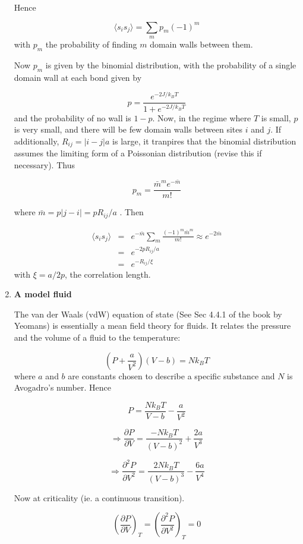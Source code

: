 \documentclass[a4paper,12pt,twoside]{article}
\begin{document}
\begin{enumerate}
Hence

\[
\langle s_i s_j\rangle =\sum_m p_m(-1)^m
\]
with $p_m$ the probability of finding $m$ domain walls between them.

Now $p_m$ is given by the binomial distribution, with the probability of
a single domain wall at each bond given by 

\[
p=\frac{e^{-2J/k_BT}}{1+e^{-2J/k_BT}}
\]
and the probability of no wall is $1-p$. 
Now, in the regime where $T$ is small, $p$ is very small, and there will be few domain walls between
sites $i$ and $j$. If additionally, $R_{ij}=|i-j|a$ is large, it tranpires that the binomial distribution
assumes the limiting form of a Poissonian distribution (revise this if necessary). Thus

\[
p_m=\frac{\bar{m}^me^{-\bar {m}}}{m!}
\] 

where $\bar{m}=p|j-i|=pR_{ij}/a$ . Then

\begin{eqnarray*}
\langle s_i s_j\rangle &=& e^{-\bar {m}}\sum_m\frac{(-1)^m\bar{m}^m} {m!}\approx e^{-2\bar{m}}\\
                       &=& e^{-2pR_{ij}/a}\\
                       &=& e^{-R_{ij}/\xi}
\end{eqnarray*}
with $\xi=a/2p$, the correlation length. 


\item{\bf A model fluid}

The van der Waals (vdW) equation of state (See Sec 4.4.1 of the book by
Yeomans) is essentially a mean field theory for fluids. It relates the
pressure and the volume of a fluid to the temperature:

\[
\left(P+\frac{a}{V^2}\right)(V-b)=Nk_BT
\]
where $a$ and $b$ are constants chosen to describe a specific substance and $N$ is Avogadro's number. Hence

\begin{equation}
P=\frac{Nk_BT}{V-b}-\frac{a}{V^2}
\label{eq:pres}
\end{equation}

\[
\Rightarrow \frac{\partial P}{\partial V}=\frac{-Nk_BT}{(V-b)^2}+\frac{2a}{V^3}
\]

\[
\Rightarrow \frac{\partial^2 P}{\partial V^2}=\frac{2Nk_BT}{(V-b)^3}-\frac{6a}{V^4}
\]

Now at criticality (ie. a continuous transition).

\[
\left(\frac{\partial P}{\partial V}\right)_T=\left(\frac{\partial^2 P}{\partial V^2}\right)_T=0
\]


\end{enumerate}
\end{document}
